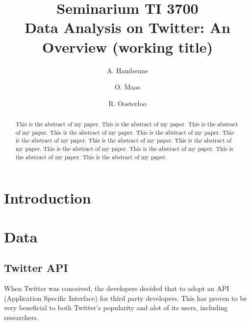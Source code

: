 \documentclass{article}
\title{Seminarium TI 3700\\ Data Analysis on Twitter: An Overview (working title)}
\author{A. Hambenne  \and
    O. Maas \and
    R. Oosterloo}
\date{}
\begin{document}
\maketitle
\thispagestyle{empty}

\begin{abstract}
This is the abstract of my paper.
This is the abstract of my paper.
This is the abstract of my paper.
This is the abstract of my paper.
This is the abstract of my paper.
This is the abstract of my paper.
This is the abstract of my paper.
This is the abstract of my paper.
This is the abstract of my paper.
This is the abstract of my paper.
This is the abstract of my paper.
This is the abstract of my paper.
\end{abstract}


\section{Introduction}

\newpage

\section{Data}

\subsection{Twitter API}

When Twitter was conceived, the developers decided that to adopt an API (Application Specific Interface) for third party developers. This has proven to be very
beneficial to both Twitter's popularity and alot of its users, including researchers.
\end{document}
